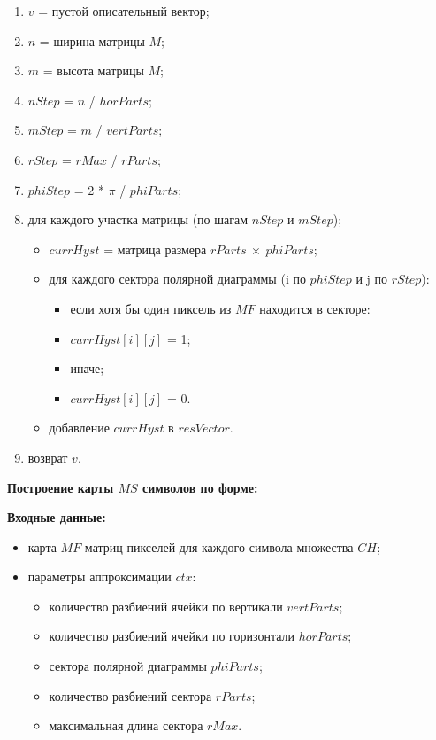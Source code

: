 \begin{enumerate}
    \item $v$ = пустой описательный вектор;
    \item $n$ = ширина матрицы $M$;
    \item $m$ = высота матрицы $M$;
    \item $nStep$ = $n$ / $horParts$;
    \item $mStep$ = $m$ / $vertParts$;
    \item $rStep$ = $rMax$ / $rParts$;
    \item $phiStep$ = 2 * $\pi$ / $phiParts$;
    \item для каждого участка матрицы (по шагам $nStep$ и $mStep$);
    \begin{itemize}
        \item $currHyst$ = матрица размера $rParts~\times~phiParts$;
        \item для каждого сектора полярной диаграммы (i по $phiStep$ и j по $rStep$):
        \begin{itemize}
            \item если хотя бы один пиксель из $MF$ находится в секторе:
            \item $currHyst[i][j]$ = 1;
            \item иначе;
            \item $currHyst[i][j]$ = 0.
        \end{itemize}
        \item добавление $currHyst$ в $resVector$.
    \end{itemize}
    \item возврат $v$.
\end{enumerate}

\textbf{Построение карты $MS$ символов по форме:}

\textbf{Входные данные:}
\begin{itemize}
    \item карта $MF$ матриц пикселей для каждого символа множества $CH$;
    \item параметры аппроксимации $ctx$: 
    \begin{itemize}
        \item количество разбиений ячейки по вертикали $vertParts$;
        \item количество разбиений ячейки по горизонтали $horParts$;
        \item сектора полярной диаграммы $phiParts$;
        \item количество разбиений сектора $rParts$;
        \item максимальная длина сектора $rMax$.
    \end{itemize}
\end{itemize}

